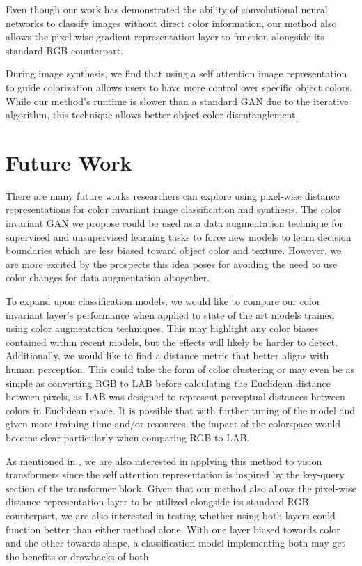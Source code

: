 \documentclass[10pt,twocolumn,letterpaper]{article}
\begin{document}
Even though our work has demonstrated the ability of convolutional neural networks to classify images without direct color information, our method also allows the pixel-wise gradient representation layer to function alongside its standard RGB counterpart.

During image synthesis, we find that using a self attention image representation to guide colorization allows users to have more control over specific object colors. While our method's runtime is slower than a standard GAN due to the iterative algorithm, this technique allows better object-color disentanglement.

\section{Future Work}

There are many future works researchers can explore using pixel-wise distance representations for color invariant image classification and synthesis. The color invariant GAN we propose could be used as a data augmentation technique for supervised and unsupervised learning tasks to force new models to learn decision boundaries which are less biased toward object color and texture. However, we are more excited by the prospects this idea poses for avoiding the need to use color changes for data augmentation altogether.

To expand upon classification models, we would like to compare our color invariant layer's performance when applied to state of the art models trained using color augmentation techniques. This may highlight any color biases contained within recent models, but the effects will likely be harder to detect. Additionally, we would like to find a distance metric that better aligns with human perception. This could take the form of color clustering or may even be as simple as converting RGB to LAB before calculating the Euclidean distance between pixels, as LAB was designed to represent perceptual distances between colors in Euclidean space. It is possible that with further tuning of the model and given more training time and/or resources, the impact of the colorspace would become clear particularly when comparing RGB to LAB.

As mentioned in , we are also interested in applying this method to vision transformers since the self attention representation is inspired by the key-query section of the transformer block. Given that our method also allows the pixel-wise distance representation layer to be utilized alongside its standard RGB counterpart, we are also interested in testing whether using both layers could function better than either method alone. With one layer biased towards color and the other towards shape, a classification model implementing both may get the benefits or drawbacks of both.
\end{document}
